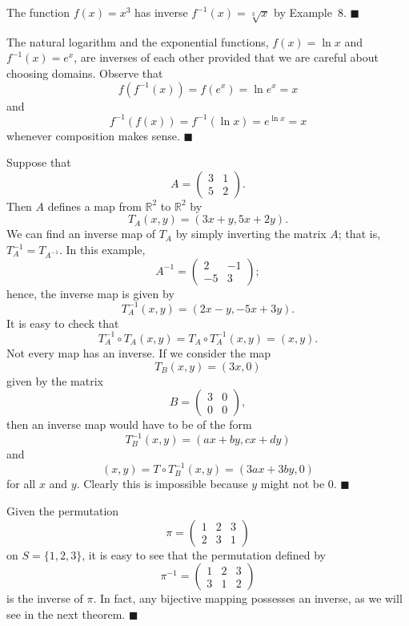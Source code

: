 \medskip

The function $f(x) = x^3$ has inverse $f^{-1}(x) = \sqrt[3]{x}$ by Example~8. \mbox{\hspace{1in}}
\hspace{\fill} $\blacksquare$

\medskip

The natural logarithm and the exponential functions, $f(x) = \ln x$ and $f^{-1}(x) = e^x$, are inverses of each other provided that we are careful about choosing domains.  Observe that  
$$
f(f^{-1}(x)) = f(e^x) = \ln e^x = x
$$
and
$$
f^{-1}(f(x)) = f^{-1}(\ln x) = e^{\ln x} = x
$$
whenever composition makes sense.
\hspace{\fill} $\blacksquare$

\medskip

Suppose that
$$
A =
\begin{pmatrix}
3 & 1 \\
5 & 2
\end{pmatrix}.
$$
Then $A$ defines a map from ${\mathbb R}^2$ to ${\mathbb R}^2$ by
$$
T_A (x,y) = (3x +  y, 5x +2y).
$$
We can find an inverse map of $T_A$ by simply inverting the matrix $A$; that is, $T_A^{-1} = T_{A^{-1}}$. In this example,
$$
A^{-1} =
\begin{pmatrix}
2  & -1 \\
-5 &  3
\end{pmatrix};
$$
hence, the inverse map is given by
$$
T_A^{-1} (x,y) = (2x -  y, -5x + 3y).
$$
It is easy to check that
$$
T^{-1}_A \circ T_A (x,y) = T_A \circ T_A^{-1} (x,y) = (x,y).
$$
Not every map has an inverse.  If we consider the map
$$
T_B (x,y) = (3x , 0 )
$$
given by the matrix
$$
B =
\begin{pmatrix}
3 & 0 \\
0 & 0
\end{pmatrix},
$$
then an inverse map would have to be of the form
$$
T_B^{-1} (x,y) = (ax + by, cx +dy)
$$
and
$$
(x,y) = T \circ T_B^{-1} (x,y) = (3ax + 3by, 0)
$$
for all $x$ and $y$.  Clearly this is  impossible because $y$ might not be 0. 
\hspace{\fill} $\blacksquare$

\medskip

Given the permutation
$$
\pi =
\begin{pmatrix}
1 & 2 & 3 \\
2 & 3 & 1
\end{pmatrix}
$$
on $S = \{ 1,2,3 \}$, it is easy to see that the permutation defined by
$$
\pi^{-1} =
\begin{pmatrix}
1 & 2 & 3 \\
3 & 1 & 2
\end{pmatrix}
$$
is the inverse of $\pi$.  In fact, any bijective mapping possesses an inverse, as we will see in the next theorem.
\hspace{\fill} $\blacksquare$
 
